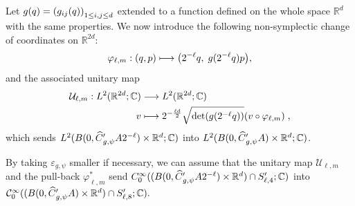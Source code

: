 \documentclass[10pt]{amsart}
\theoremstyle{definition}\newtheorem{defi}[theo]{Definition}\newtheorem{rema}[theo]{Remark}\newtheorem{exam}[theo]{Example}\newtheorem{exem}[theo]{Example}\newtheorem{nota}[theo]{Notation}
\newcommand{\C}{\mathbb{C}}
\newcommand{\R}{\mathbb{R}}
\newcommand{\clC}{\mathcal{C}}
\newcommand{\clU}{\mathcal{U}}
\let\oldhat\hat
\renewcommand*{\hat}[1]{\mathchoice{\widehat{#1}}{\widehat{#1}}{\oldhat{#1}}{\oldhat{#1}}}
\let\originalleft\left
\let\originalright\right
\renewcommand{\left}{\mathopen{}\mathclose\bgroup\originalleft}
\renewcommand{\right}{\aftergroup\egroup\originalright}
\renewcommand*{\to}{\mathchoice{\longrightarrow}{\rightarrow}{\rightarrow}{\rightarrow}}
\let\oldmapsto\mapsto
\renewcommand*{\mapsto}{\mathchoice{\longmapsto}{\oldmapsto}{\oldmapsto}{\oldmapsto}}
\begin{document}
Let $g(q) = \left(g_{ij}(q)\right)_{1 \le i, j \le d}$ extended to a function defined on the whole space $\R^d$ with the same properties. We now introduce the following non-symplectic change of coordinates on $\R^{2d}$:
\begin{equation}\label{eq:defvphiellm}
\varphi_{\ell,m} : (q,p) \mapsto
\left(2^{-\ell}q,\;g(2^{-\ell}q)p
\right),
\end{equation}
and the associated unitary map
\begin{align*}
\clU_{\ell,m} :
L^2(\R^{2d};\C) & \to L^2(\R^{2d} ; \C) \\
v & \mapsto 2^{-\frac{\ell d}{2}}\sqrt{\det (g(2^{-\ell}q))} (v\circ \varphi_{\ell,m}) \;,
\end{align*}
which sends $L^2(B(0, \hat{C}'_{g, \psi} A 2^{-\ell})\times\R^d;\C)$ into $L^2(B(0, \hat{C}'_{g, \psi} A) \times \R^d ; \C)$.

By taking $\varepsilon_{g,\psi}$ smaller if necessary, we can assume that the unitary map $\clU_{\ell,m}$ and the pull-back $\varphi_{\ell,m}^*$ send $C^\infty_0((B(0, \hat{C}'_{g, \psi} A 2^{-\ell}) \times \R^d) \cap S'_{\ell,4}; \C)$ into $\clC^{\infty}_0((B(0,\hat{C}'_{g,\psi}A)\times \R^d) \cap S_{\ell,8}' ;\C).$
\end{document}
